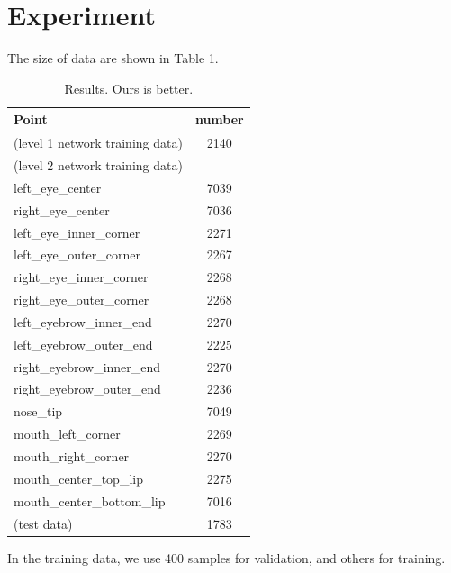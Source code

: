 \documentclass[10pt,twocolumn,letterpaper]{article}
\begin{document}
\section{Experiment}

The size of data are shown in Table 1. \\
\begin{table}
\begin{center}
\begin{tabular}{|l|c|}
\hline
Point & number \\
\hline\hline
(level 1 network training data) & 2140\\
(level 2 network training data) & \\
left\_eye\_center & 7039 \\
right\_eye\_center & 7036 \\
left\_eye\_inner\_corner & 2271 \\
left\_eye\_outer\_corner & 2267 \\
right\_eye\_inner\_corner & 2268 \\
right\_eye\_outer\_corner & 2268 \\
left\_eyebrow\_inner\_end & 2270\\
left\_eyebrow\_outer\_end & 2225\\
right\_eyebrow\_inner\_end & 2270 \\
right\_eyebrow\_outer\_end & 2236 \\
nose\_tip & 7049 \\
mouth\_left\_corner & 2269 \\
mouth\_right\_corner & 2270 \\
mouth\_center\_top\_lip & 2275\\
mouth\_center\_bottom\_lip & 7016\\
(test data) & 1783 \\ 
\hline
\end{tabular}
\end{center}
\caption{Results.   Ours is better.}
\end{table}

In the training data, we use 400 samples for validation, and others for training. \\
\end{document}
